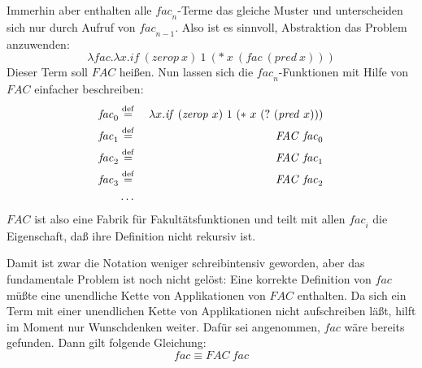 Immerhin aber enthalten alle $\mathit{fac}_n$-Terme das
gleiche Muster und unterscheiden sich nur durch Aufruf von
$\mathit{fac}_{n-1}$.  Also ist es sinnvoll, Abstraktion
das Problem anzuwenden:
%
\begin{displaymath}
  \lambda\mathit{fac}.\lambda x.\mathit{if}~(\mathit{zerop}~x)~1~(\ast~x~(\mathit{fac}~(\mathit{pred}~x)))
\end{displaymath}
%
Dieser Term soll $\mathit{FAC}$ heißen.  Nun lassen sich die
$\mathit{fac}_n$-Funktionen mit Hilfe von $\mathit{FAC}$ einfacher beschreiben:
%
\begin{eqnarray*}
   \mathit{fac}_0 &\stackrel{\rm def}{=}{}& \lambda x.\mathit{if}~(\mathit{zerop}~x)~1~(\ast~x~(?~(\mathit{pred}~x)))\\
   \mathit{fac}_1 &\stackrel{\rm def}{=}{}& \mathit{FAC}~\mathit{fac}_0\\
   \mathit{fac}_2 &\stackrel{\rm def}{=}{}& \mathit{FAC}~\mathit{fac}_1\\
   \mathit{fac}_3 &\stackrel{\rm def}{=}{}& \mathit{FAC}~\mathit{fac}_2\\
   &\ldots&
\end{eqnarray*}
%
$\mathit{FAC}$ ist also eine Fabrik für Fakultätsfunktionen und
teilt mit allen $\mathit{fac}_i$ die Eigenschaft, daß ihre
Definition nicht rekursiv ist.

Damit ist zwar die Notation weniger schreibintensiv geworden,
aber das fundamentale Problem ist noch nicht gelöst: Eine korrekte
Definition von $\mathit{fac}$ müßte eine unendliche
Kette von Applikationen von $\mathit{FAC}$ enthalten.
Da sich ein Term mit einer unendlichen Kette von Applikationen nicht aufschreiben läßt, hilft im Moment nur Wunschdenken weiter.
Dafür sei angenommen, $\mathit{fac}$ wäre bereits gefunden.  Dann gilt folgende
Gleichung:
%
\begin{displaymath}
  \mathit{fac} \equiv \mathit{FAC}~\mathit{fac}
\end{displaymath}

